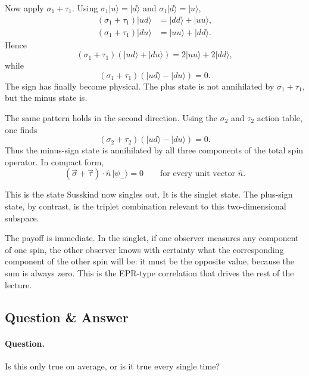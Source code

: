 Now apply \(\sigma_1+\tau_1\). Using \(\sigma_1|u\rangle=|d\rangle\) and \(\sigma_1|d\rangle=|u\rangle\),
\begin{align}
(\sigma_1+\tau_1)|ud\rangle &= |dd\rangle + |uu\rangle, \\
(\sigma_1+\tau_1)|du\rangle &= |uu\rangle + |dd\rangle.
\end{align}
Hence
\begin{equation}
(\sigma_1+\tau_1)(|ud\rangle+|du\rangle)
=
2|uu\rangle+2|dd\rangle,
\end{equation}
while
\begin{equation}
(\sigma_1+\tau_1)(|ud\rangle-|du\rangle)=0.
\end{equation}
The sign has finally become physical. The plus state is not annihilated by \(\sigma_1+\tau_1\), but the minus state is.

The same pattern holds in the second direction. Using the \(\sigma_2\) and \(\tau_2\) action table, one finds
\begin{equation}
(\sigma_2+\tau_2)(|ud\rangle-|du\rangle)=0.
\end{equation}
Thus the minus-sign state is annihilated by all three components of the total spin operator. In compact form,
\begin{equation}
(\vec{\sigma}+\vec{\tau})\cdot \hat n\,|\psi_-\rangle=0
\qquad
\text{for every unit vector }\hat n.
\end{equation}

This is the state Susskind now singles out. It is the singlet state. The plus-sign state, by contrast, is the triplet combination relevant to this two-dimensional subspace.

The payoff is immediate. In the singlet, if one observer measures any component of one spin, the other observer knows with certainty what the corresponding component of the other spin will be: it must be the opposite value, because the sum is always zero. This is the EPR-type correlation that drives the rest of the lecture.

\subsection{Question \& Answer}

\paragraph{Question.} Is this only true on average, or is it true every single time?

